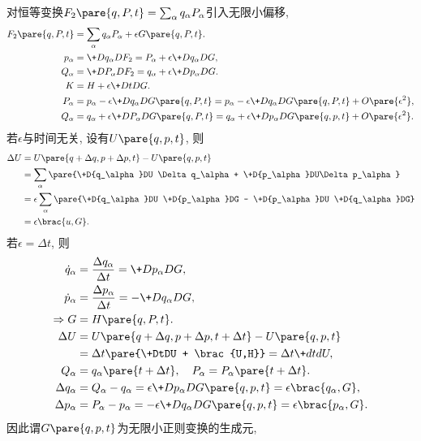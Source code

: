 \documentclass[../LectureNotes.tex]{subfiles}
\begin{document}
对恒等变换$F_2\pare{q,P,t} = \sum_\alpha q_\alpha P_\alpha$引入无限小偏移,
\begin{align*}
    F_2\pare{q,P,t} &= \sum_\alpha q_\alpha P_\alpha + \epsilon G\pare{q,P,t}. \\
    p_\alpha &= \+D{q_\alpha}D{F_2} = P_\alpha + \epsilon \+D{q_\alpha}DG, \\
    Q_\alpha &= \+D{P_\alpha}D{F_2} = q_\alpha + \epsilon \+D{p_\alpha}DG. \\
    K &= H + \epsilon \+DtDG. \\
    P_\alpha &= p_\alpha - \epsilon \+D{q_\alpha}D{G\pare{q,P,t}} = p_\alpha - \epsilon \+D{q_\alpha}D{G\pare{q,P,t}} + O\pare{\epsilon^2}, \\
    Q_\alpha &= q_\alpha + \epsilon \+D{P_\alpha}D{G\pare{q,P,t}} = q_\alpha + \epsilon \+D{p_\alpha}D{G\pare{q,p,t}} + O\pare{\epsilon^2}.
\end{align*}
若$\epsilon$与时间无关, 设有$U\pare{q,p,t}$, 则
\begin{align*}
    \Delta U &= U\pare{q+\Delta q,p+\Delta p, t} - U\pare{q,p,t} \\
    &= \sum_\alpha \pare{\+D{q_\alpha}DU \Delta q_\alpha + \+D{p_\alpha}DU\Delta p_\alpha} \\
    &= \epsilon \sum_\alpha \pare{\+D{q_\alpha}DU \+D{p_\alpha}DG - \+D{p_\alpha}DU \+D{q_\alpha}DG} \\
    &= \epsilon\brac{u,G}.
\end{align*}
若$\epsilon = \Delta t$, 则
\begin{align*}
    \dot{q}_\alpha &= \frac{\Delta q_\alpha}{\Delta t} = \+D{p_\alpha}DG, \\
    \dot{p}_\alpha &= \frac{\Delta p_\alpha}{\Delta t} = -\+D{q_\alpha}DG, \\
    \Rightarrow G &= H\pare{q,P,t}. \\
    \Delta U &= U\pare{q+\Delta q, p+\Delta p, t+\Delta t} - U\pare{q,p,t} \\
    &= \Delta t \pare{\+DtDU + \brac{U,H}} = \Delta t \+dtdU, \\
    Q_\alpha &= q_\alpha\pare{t+\Delta t}, \quad P_\alpha = P_\alpha\pare{t+\Delta t}. \\
    \Delta q_\alpha &= Q_\alpha - q_\alpha = \epsilon \+D{p_\alpha}D{G\pare{q,p,t}} = \epsilon \brac{q_\alpha,G}, \\
    \Delta p_\alpha &= P_\alpha - p_\alpha = -\epsilon \+D{q_\alpha}D{G\pare{q,p,t}} = \epsilon\brac{p_\alpha,G}.
\end{align*}
因此谓$G\pare{q,p,t}$为无限小正则变换的生成元,
\end{document}
